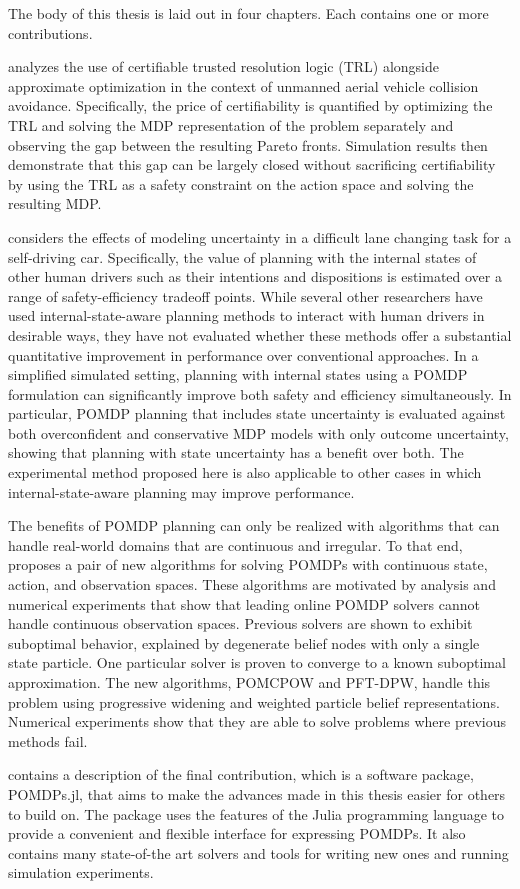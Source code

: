 The body of this thesis is laid out in four chapters.
Each contains one or more contributions.

 analyzes the use of certifiable trusted resolution logic (TRL) alongside approximate optimization in the context of unmanned aerial vehicle collision avoidance.
Specifically, the price of certifiability is quantified by optimizing the TRL and solving the MDP representation of the problem separately and observing the gap between the resulting Pareto fronts.
Simulation results then demonstrate that this gap can be largely closed without sacrificing certifiability by using the TRL as a safety constraint on the action space and solving the resulting MDP.

 considers the effects of modeling uncertainty in a difficult lane changing task for a self-driving car.
Specifically, the value of planning with the internal states of other human drivers such as their intentions and dispositions is estimated over a range of safety-efficiency tradeoff points.
While several other researchers have used internal-state-aware planning methods to interact with human drivers in desirable ways, they have not evaluated whether these methods offer a substantial quantitative improvement in performance over conventional approaches.
In a simplified simulated setting, planning with internal states using a POMDP formulation can significantly improve both safety and efficiency simultaneously.
In particular, POMDP planning that includes state uncertainty is evaluated against both overconfident and conservative MDP models with only outcome uncertainty, showing that planning with state uncertainty has a benefit over both.
The experimental method proposed here is also applicable to other cases in which internal-state-aware planning may improve performance.

The benefits of POMDP planning can only be realized with algorithms that can handle real-world domains that are continuous and irregular.
To that end,  proposes a pair of new algorithms for solving POMDPs with continuous state, action, and observation spaces.
These algorithms are motivated by analysis and numerical experiments that show that leading online POMDP solvers cannot handle continuous observation spaces.
Previous solvers are shown to exhibit suboptimal behavior, explained by degenerate belief nodes with only a single state particle.
One particular solver is proven to converge to a known suboptimal approximation.
The new algorithms, POMCPOW and PFT-DPW, handle this problem using progressive widening and weighted particle belief representations.
Numerical experiments show that they are able to solve problems where previous methods fail.

 contains a description of the final contribution, which is a software package, POMDPs.jl, that aims to make the advances made in this thesis easier for others to build on.
The package uses the features of the Julia programming language to provide a convenient and flexible interface for expressing POMDPs.
It also contains many state-of-the art solvers and tools for writing new ones and running simulation experiments.
